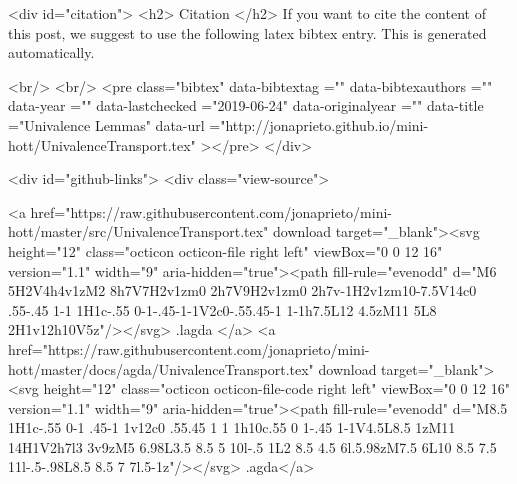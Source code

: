   
  <div id="citation">
  <h2> Citation </h2>
  If you want to cite the content of this post,
  we suggest to use the following latex bibtex entry.
  This is generated automatically.

  <br/>
  <br/>
  <pre class="bibtex"
       data-bibtextag =""
       data-bibtexauthors =""
       data-year =""
       data-lastchecked ="2019-06-24"
       data-originalyear =""
       data-title ="Univalence Lemmas"
       data-url ="http://jonaprieto.github.io/mini-hott/UnivalenceTransport.tex"
  ></pre>
  </div>
  

  <div id="github-links">
    <div class="view-source">
      
        <a href="https://raw.githubusercontent.com/jonaprieto/mini-hott/master/src/UnivalenceTransport.tex" download target="_blank"><svg height="12" class="octicon octicon-file right left" viewBox="0 0 12 16" version="1.1" width="9" aria-hidden="true"><path fill-rule="evenodd" d="M6 5H2V4h4v1zM2 8h7V7H2v1zm0 2h7V9H2v1zm0 2h7v-1H2v1zm10-7.5V14c0 .55-.45 1-1 1H1c-.55 0-1-.45-1-1V2c0-.55.45-1 1-1h7.5L12 4.5zM11 5L8 2H1v12h10V5z"/></svg> .lagda </a>
        <a href="https://raw.githubusercontent.com/jonaprieto/mini-hott/master/docs/agda/UnivalenceTransport.tex" download target="_blank"><svg height="12" class="octicon octicon-file-code right left" viewBox="0 0 12 16" version="1.1" width="9" aria-hidden="true"><path fill-rule="evenodd" d="M8.5 1H1c-.55 0-1 .45-1 1v12c0 .55.45 1 1 1h10c.55 0 1-.45 1-1V4.5L8.5 1zM11 14H1V2h7l3 3v9zM5 6.98L3.5 8.5 5 10l-.5 1L2 8.5 4.5 6l.5.98zM7.5 6L10 8.5 7.5 11l-.5-.98L8.5 8.5 7 7l.5-1z"/></svg> .agda</a>
      

